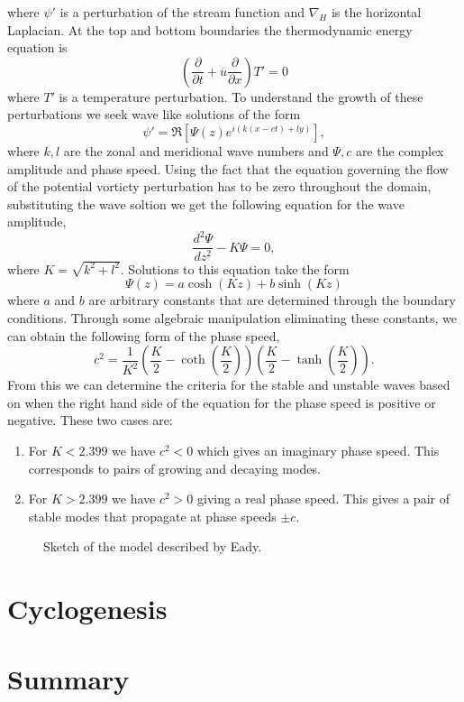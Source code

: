 \documentclass{article}
\begin{document}
where $\psi'$ is a perturbation of the stream function and $\nabla_H$ is the horizontal Laplacian. At the top and bottom boundaries the thermodynamic energy equation is 
\begin{equation}
  \left(\frac{\partial}{\partial t}+\overline{u}\frac{\partial}{\partial x}\right)T' = 0
\end{equation}
where $T'$ is a temperature perturbation. To understand the growth of these perturbations we seek wave like solutions of the form 
\begin{equation}
  \psi' = \Re\left[\Psi(z)e^{i(k(x-ct)+ly)}\right],
\end{equation}
where $k,l$ are the zonal and meridional wave numbers and $\Psi,c$ are the complex amplitude and phase speed. Using the fact that the equation governing the flow of the potential vorticty perturbation has to be zero throughout the domain, substituting the wave soltion we get the following equation for the wave amplitude, 
\begin{equation}
  \frac{d^2\Psi}{dz^2} - K\Psi = 0,
\end{equation}
where $K=\sqrt{k^2+l^2}$. Solutions to this equation take the form 
\begin{equation}
  \Psi(z) = a\cosh(Kz)+b\sinh(Kz)
\end{equation}
where $a$ and $b$ are arbitrary constants that are determined through the boundary conditions. Through some algebraic manipulation eliminating these constants, we can obtain the following form of the phase speed,
\begin{equation}
  c^2 = \frac{1}{K^2}\left(\frac{K}{2}-\coth\left(\frac{K}{2}\right)\right)\left(\frac{K}{2}-\tanh\left(\frac{K}{2}\right)\right).
\end{equation}
From this we can determine the criteria for the stable and unstable waves based on when the right hand side of the equation for the phase speed is positive or negative. These two cases are:
\begin{enumerate}
  \item For $K<2.399$ we have $c^2<0$ which gives an imaginary phase speed. This corresponds to pairs of growing and decaying modes. 
  \item For $K>2.399$ we have $c^2>0$ giving a real phase speed. This gives a pair of stable modes that propagate at phase speeds $\pm c$. 
\end{enumerate}
\begin{figure}[hb]
  \centering
  
  \caption{Sketch of the model described by Eady.}
  \label{eadyexample}
\end{figure}

\section{Cyclogenesis} 

\section{Summary}


\end{document}
